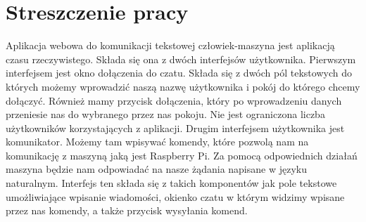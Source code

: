 \section{Streszczenie pracy}
Aplikacja webowa do komunikacji tekstowej człowiek-maszyna jest aplikacją czasu rzeczywistego. Składa się ona z dwóch interfejsów użytkownika. Pierwszym interfejsem jest okno dołączenia do czatu. Składa się z dwóch pól tekstowych do których możemy wprowadzić naszą nazwę użytkownika i pokój do którego chcemy dołączyć. Również mamy przycisk dołączenia, który po wprowadzeniu danych przeniesie nas do wybranego przez nas pokoju. Nie jest ograniczona liczba użytkowników korzystających z aplikacji. 
Drugim interfejsem użytkownika jest komunikator. Możemy tam wpisywać komendy, które pozwolą nam na komunikację z maszyną jaką jest Raspberry Pi. Za pomocą odpowiednich działań maszyna będzie nam odpowiadać na nasze żądania napisane w języku naturalnym. Interfejs ten składa się z takich komponentów jak pole tekstowe umożliwiające wpisanie wiadomości, okienko czatu w którym widzimy wpisane przez nas komendy, a także przycisk wysyłania komend.
